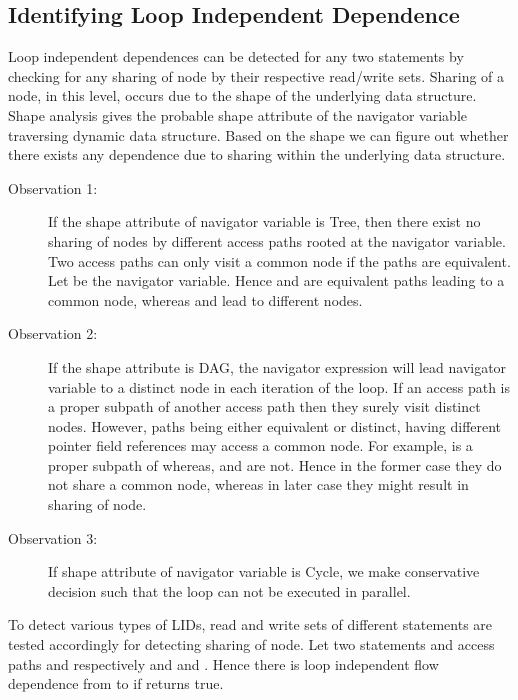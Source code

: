 \subsection{Identifying Loop Independent Dependence}
Loop independent dependences can be detected for 
any two statements by checking for any sharing of node by their 
respective read/write sets. Sharing of a node, in this level, occurs due to 
the shape of the underlying data structure. Shape analysis gives the 
probable shape attribute of the navigator variable traversing dynamic data structure. Based 
on the shape we can figure out whether 
there exists any dependence due to sharing within the underlying data structure. 
\begin{description}
\item[Observation 1:]If the shape attribute of navigator variable is Tree, then there 
exist no sharing of nodes by different access paths rooted at the navigator variable. Two access paths can only visit 
a common node if the paths are equivalent. Let  be the navigator variable. Hence  and  
are equivalent paths leading to a common node, whereas  and  lead to different nodes.

\item[Observation 2:] If the shape attribute is DAG, the navigator expression will lead navigator 
variable to a distinct node in each iteration of the loop. If an access path is a proper subpath 
of another access path then they surely visit distinct nodes. However, paths being either equivalent or distinct, having different 
pointer field references may access a common node. For example,  is a proper subpath of 
 whereas,  and 
 are not. Hence in the former case they do not share a common node, whereas  
in later case they might result in sharing of node.

\item[Observation 3:] If shape attribute of navigator variable is Cycle, we make conservative decision such that the loop can 
not be executed in parallel.
\end{description}
To detect various types of LIDs, read and write sets of different statements are tested 
accordingly for detecting sharing of node. Let two statements  and  access paths 
 and  respectively and  and . 
Hence there is loop independent flow dependence from  to  if  returns true.

